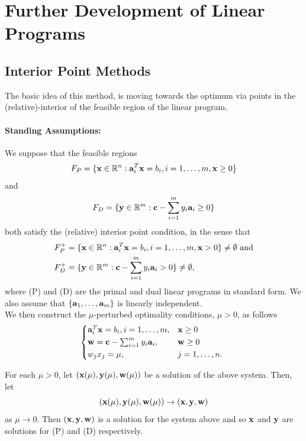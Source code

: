 
\section{Further Development of Linear Programs}

\subsection{Interior Point Methods}

The basic idea of this method, is moving towards the optimum via points in the (relative)-interior of the feasible region of the linear program.

\paragraph{Standing Assumptions:} We suppose that the feasible regions
\[F_P = \{\mathbf{x} \in \mathbb{R}^n: \mathbf{a}_i^T\mathbf{x} = b_i, i = 1,\dots,m, \mathbf{x} \geq 0\}\]
and
\[F_D = \{\mathbf{y} \in \mathbb{R}^m: \mathbf{c} - \sum_{i = 1}^m y_i\mathbf{a}_i \geq 0\}\]
both satisfy the (relative) interior point condition, in the sense that
\begin{align*}
    F_P^+ & = \{\mathbf{x} \in \mathbb{R}^n : \mathbf{a}_i^T \mathbf{x} = b_i, i = 1, \dots, m, \mathbf{x} > 0\} \neq \emptyset \text{ and} \\
    F_D^+ & = \{\mathbf{y} \in \mathbb{R}^m: \mathbf{c} - \sum_{i = 1}^m y_i\mathbf{a}_i > 0\} \neq \emptyset,
\end{align*}
where (P) and (D) are the primal and dual linear programs in standard form. We also assume that \(\{\mathbf{a}_1, \dots, \mathbf{a}_m\}\) is linearly independent. \\

We then construct the \(\mu\)-perturbed optimality conditions, \(\mu > 0\), as follows
\[
    \begin{cases*}
        \fa_i^T\fx = b_i, i=1,\dots,m, & \(\fx \geq 0\) \\
        \fw = \fc - \sum_{i=1}^m  y_i\fa_i, & \(\fw \geq 0\) \\
        w_jx_j = \mu, & \(j=1,\dots,n\).
    \end{cases*}
\]

For each \(\mu > 0\), let \((\mathbf{x}(\mu), \mathbf{y}(\mu), \mathbf{w}(\mu))\) be a solution of the above system. Then, let
\[(\mathbf{x}(\mu), \mathbf{y}(\mu), \mathbf{w}(\mu)) \to (\mathbf{x}, \mathbf{y}, \mathbf{w})\]
as \(\mu \to 0\). Then \((\mathbf{x}, \mathbf{y}, \mathbf{w})\) is a solution for the system above and so \(\mathbf{x}\) and \(\mathbf{y}\) are solutions for (P) and (D) respectively. \\

